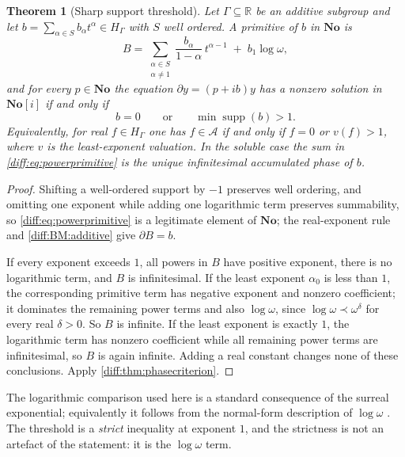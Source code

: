 \documentclass[11pt,letterpaper]{article}
\numberwithin{equation}{section}
\newtheorem{theorem}{Theorem}[section]
\theoremstyle{definition}
\theoremstyle{remark}
\newcommand{\No}{\mathbf{No}}
\newcommand{\SC}{\mathbf{No}[i]}
\newcommand{\R}{\mathbb R}
\newcommand{\der}{\partial}
\newcommand{\Acl}{\mathcal A}
\newcommand{\supp}{\operatorname{supp}}
\begin{document}
\begin{theorem}[Sharp support threshold]
\label{diff:thm:power}
Let $\Gamma\subseteq\R$ be an additive subgroup and let
$b=\sum_{\alpha\in S}b_{\alpha}t^{\alpha}\in H_{\Gamma}$ with $S$ well
ordered. A primitive of $b$ in $\No$ is
\begin{equation}\label{diff:eq:powerprimitive}
 B=\sum_{\substack{\alpha\in S\\ \alpha\neq1}}
 \frac{b_{\alpha}}{1-\alpha}\,t^{\alpha-1}
 \;+\;b_{1}\log\omega ,
\end{equation}
and for every $p\in\No$ the equation $\der y=(p+ib)y$ has a nonzero solution
in $\SC$ if and only if
\begin{equation}\label{diff:eq:powerthreshold}
 b=0\qquad\text{or}\qquad \min\supp(b)>1 .
\end{equation}
Equivalently, for real $f\in H_{\Gamma}$ one has $f\in\Acl$ if and only if
$f=0$ or $v(f)>1$, where $v$ is the least-exponent valuation. In the soluble
case the sum in \cref{diff:eq:powerprimitive} is the unique infinitesimal
accumulated phase of $b$.
\end{theorem}
\begin{proof}
Shifting a well-ordered support by $-1$ preserves well ordering, and omitting
one exponent while adding one logarithmic term preserves summability, so
\cref{diff:eq:powerprimitive} is a legitimate element of $\No$; the
real-exponent rule and \ref{diff:BM:additive} give $\der B=b$.

If every exponent exceeds $1$, all powers in $B$ have positive exponent, there
is no logarithmic term, and $B$ is infinitesimal. If the least exponent
$\alpha_{0}$ is less than $1$, the corresponding primitive term has negative
exponent and nonzero coefficient; it dominates the remaining power terms and
also $\log\omega$, since $\log\omega\prec\omega^{\delta}$ for every real
$\delta>0$. So $B$ is infinite. If the least exponent is exactly $1$, the
logarithmic term has nonzero coefficient while all remaining power terms are
infinitesimal, so $B$ is again infinite. Adding a real constant changes none of
these conclusions. Apply \cref{diff:thm:phasecriterion}.
\end{proof}

The logarithmic comparison used here is a standard consequence of the surreal
exponential; equivalently it follows from the normal-form description of
$\log\omega$ \cite{BM,Gonshor}. The threshold is a \emph{strict} inequality at
exponent $1$, and the strictness is not an artefact of the statement: it is
the $\log\omega$ term.
\end{document}
